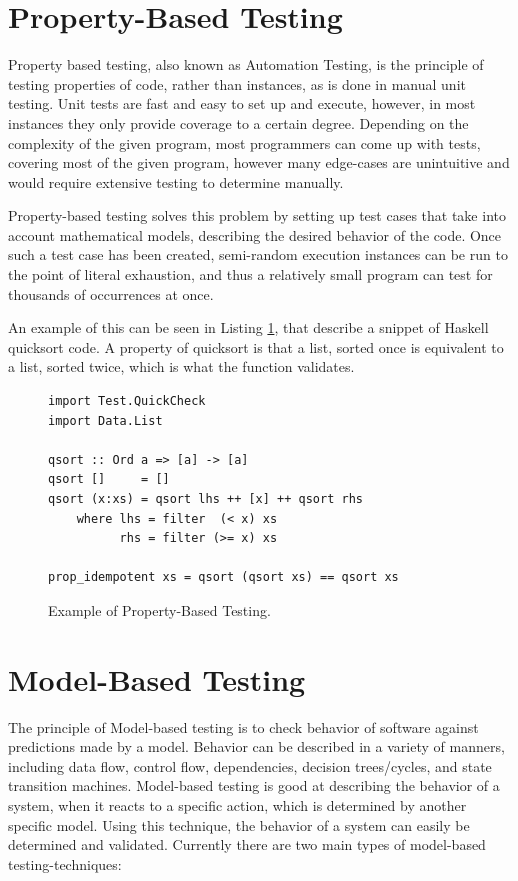 \section{Property-Based Testing}

Property based testing, also known as Automation Testing, is the principle of testing properties of code, rather than instances, as is done in manual unit testing. Unit tests are fast and easy to set up and execute, however, in most instances they only provide coverage to a certain degree. Depending on the complexity of the given program, most programmers can come up with tests, covering most of the given program, however many edge-cases are unintuitive and would require extensive testing to determine manually.

Property-based testing solves this problem by setting up test cases that take into account mathematical models, describing the desired behavior of the code. Once such a test case has been created, semi-random execution instances can be run to the point of literal exhaustion, and thus a relatively small program can test for thousands of occurrences at once.

An example of this can be seen in Listing \ref{fig:pbtEx}, that describe a snippet of Haskell quicksort code. A property of quicksort is that a list, sorted once is equivalent to a list, sorted twice, which is what the function  validates.
\begin{figure}
	\centering
	\begin{lstlisting}
import Test.QuickCheck
import Data.List

qsort :: Ord a => [a] -> [a]
qsort []     = []
qsort (x:xs) = qsort lhs ++ [x] ++ qsort rhs
    where lhs = filter  (< x) xs
          rhs = filter (>= x) xs

prop_idempotent xs = qsort (qsort xs) == qsort xs
	\end{lstlisting}
	\caption{Example of Property-Based Testing. \cite{realWorldHaskell11}}
	\label{fig:pbtEx}
\end{figure}

\section{Model-Based Testing}

The principle of Model-based testing is to check behavior of software against predictions made by a model. Behavior can be described in a variety of manners, including data flow, control flow, dependencies, decision trees/cycles, and state transition machines. Model-based testing is good at describing the behavior of a system, when it reacts to a specific action, which is determined by another specific model. Using this technique, the behavior of a system can easily be determined and validated. Currently there are two main types of model-based testing-techniques:

